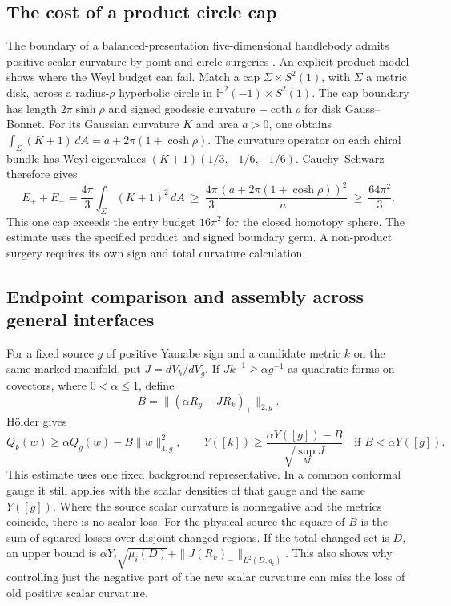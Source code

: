 \documentclass[11pt,letterpaper]{article}
\numberwithin{equation}{section}
\theoremstyle{remark}
\begin{document}
\subsection{The cost of a product circle cap}
The boundary of a balanced-presentation five-dimensional handlebody
admits positive scalar curvature by point and circle surgeries
\cite[Theorem A]{GromovLawson1980Surgery}. An explicit product model
shows where the Weyl budget can fail. Match a cap
\(\Sigma\times S^2(1)\), with \(\Sigma\) a metric disk, across a
radius-\(\rho\) hyperbolic circle in \(\mathbb H^2(-1)\times S^2(1)\).
The cap boundary has length \(2\pi\sinh\rho\) and signed geodesic
curvature \(-\coth\rho\) for disk Gauss--Bonnet. For its Gaussian
curvature \(K\) and area \(a>0\), one obtains
\(\int_\Sigma(K+1)\,dA=a+2\pi(1+\cosh\rho)\).
The curvature operator on each chiral bundle has Weyl eigenvalues
\((K+1)(1/3,-1/6,-1/6)\). Cauchy--Schwarz therefore gives
\[
 E_++E_-=\frac{4\pi}{3}\int_\Sigma(K+1)^2\,dA
 \ \ge\ \frac{4\pi}{3}\frac{(a+2\pi(1+\cosh\rho))^2}{a}
 \ \ge\ \frac{64\pi^2}{3}.
\]
This one cap exceeds the entry budget \(16\pi^2\) for the closed
homotopy sphere. The estimate uses the specified product and signed
boundary germ. A non-product surgery requires its own sign and total
curvature calculation.

\subsection{Endpoint comparison and assembly across general interfaces}

For a fixed source \(g\) of positive Yamabe sign and a candidate
metric \(k\) on the same marked manifold, put \(J=dV_k/dV_g\).
If \(Jk^{-1}\ge\alpha g^{-1}\) as quadratic forms on covectors,
where \(0<\alpha\le1\), define
\[
 B=\|(\alpha R_g-JR_k)_+\|_{2,g}.
\]
H\"older gives
\begin{equation}\label{eq:scalar-budget}
 Q_k(w)\ge\alpha Q_g(w)-B\|w\|_{4,g}^2,\qquad
 Y([k])\ge\frac{\alpha Y([g])-B}{\sqrt{\sup_M J}}
 \quad\text{if }B<\alpha Y([g]).
\end{equation}
This estimate uses one fixed background representative. In a
common conformal gauge it still applies with the scalar densities
of that gauge and the same \(Y([g])\). Where the source scalar
curvature is nonnegative and the metrics coincide, there is no
scalar loss. For the physical source the square of \(B\) is the
sum of squared losses over disjoint changed regions. If the
total changed set is \(D\), an upper bound is
\(\alpha Y_i\sqrt{\mu_i(D)}+\|J(R_k)_-\|_{L^2(D,g_i)}\).
This also shows why controlling just the negative part of the
new scalar curvature can miss the loss of old positive scalar
curvature.
\end{document}
